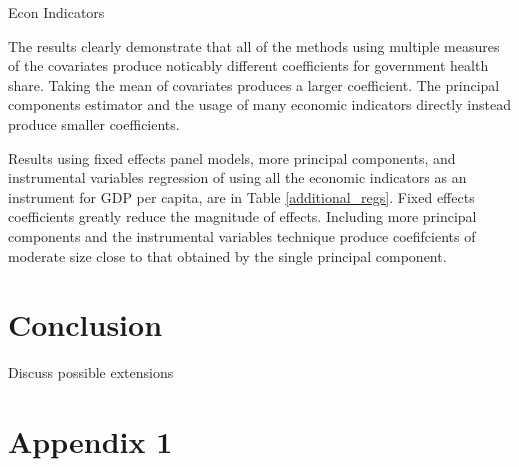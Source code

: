 \documentclass[12pt]{article}
\begin{document}
        

        \begin{table}[!htbp] \centering
            \caption{Econ Indicators \label{Econ_Indicators}}
            
        \end{table}

        The results clearly demonstrate that all of the methods using multiple measures of the covariates produce noticably different coefficients for government health share. Taking the mean of covariates produces a larger coefficient. The principal components estimator and the usage of many economic indicators directly instead produce smaller coefficients.

        Results using fixed effects panel models, more principal components, and instrumental variables regression of using all the economic indicators as an instrument for GDP per capita, are in Table \ref{additional_regs}. Fixed effects coefficients greatly reduce the magnitude of effects. Including more principal components and the instrumental variables technique produce coefifcients of moderate size close to that obtained by the single principal component.

        



    \section*{Conclusion}
        
        Discuss possible extensions

    \clearpage \newpage

    \appendix

    \section*{Appendix 1}

        
        
        
        
        
\end{document}
